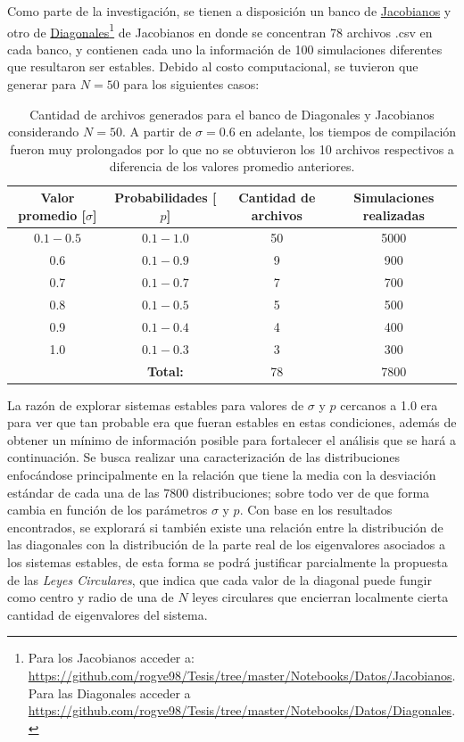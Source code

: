 \documentclass[a4paper,11pt]{book}
\theoremstyle{plain}
\theoremstyle{definition}
\begin{document}
Como parte de la investigación, se tienen  a disposición un banco de \href{https://github.com/rogve98/Tesis/tree/master/Notebooks/Datos/Jacobianos}{Jacobianos} y otro de \href{https://github.com/rogve98/Tesis/tree/master/Notebooks/Datos/Diagonales}{Diagonales}\footnote{Para los Jacobianos acceder a: \url{https://github.com/rogve98/Tesis/tree/master/Notebooks/Datos/Jacobianos}. Para las Diagonales acceder a \url{https://github.com/rogve98/Tesis/tree/master/Notebooks/Datos/Diagonales}.} de Jacobianos en donde se concentran 78 archivos .csv en cada banco, y contienen cada uno la información de 100 simulaciones diferentes que resultaron ser estables. Debido al costo computacional, se tuvieron que generar para $N=50$ para los siguientes casos:
\begin{table}[h!]
	\centering
	\begin{tabular}{|c|c|c|c|}
		\hline
		Valor promedio [$\sigma$] & Probabilidades [$p$] & Cantidad de archivos & Simulaciones realizadas \\ \hline
		$0.1-0.5$  & $0.1-1.0$  & 50 & 5000  \\ \hline
		0.6  & $0.1-0.9$  & 9 & 900 \\ \hline
		0.7  & $0.1-0.7$  & 7 & 700 \\ \hline
		0.8  & $0.1-0.5$  & 5 & 500 \\ \hline
		0.9  & $0.1-0.4$  & 4 & 400 \\ \hline
		1.0  & $0.1-0.3$  & 3 & 300 \\ \hline
		& \textbf{Total:} & 78& 7800\\ \hline
	\end{tabular}
	\caption{Cantidad de archivos generados para el banco de Diagonales y Jacobianos considerando $N=50$. A partir de $\sigma=0.6$ en adelante, los tiempos de compilación fueron muy prolongados por lo que no se obtuvieron los 10 archivos respectivos a diferencia de los valores promedio anteriores.}
	\label{tab:Simulaciones}
\end{table} 

La razón de explorar sistemas estables para valores de $\sigma$ y $p$ cercanos a 1.0 era para ver que tan probable era que fueran estables en estas condiciones, además de obtener un mínimo de información posible para fortalecer el análisis que se hará a continuación. Se busca realizar una caracterización de las distribuciones enfocándose principalmente en la relación que tiene la media con la desviación estándar de cada una de las 7800 distribuciones; sobre todo ver de que forma cambia en función de los parámetros $\sigma$ y $p$. Con base en los resultados encontrados, se explorará si también existe una relación entre la distribución de las diagonales con la distribución de la parte real de los eigenvalores asociados a los sistemas estables, de esta forma se podrá justificar parcialmente la propuesta de las \textit{Leyes Circulares}, que indica que cada valor de la diagonal puede fungir como centro y radio de una de $N$ leyes circulares que encierran localmente cierta cantidad de eigenvalores del sistema.
\end{document}
